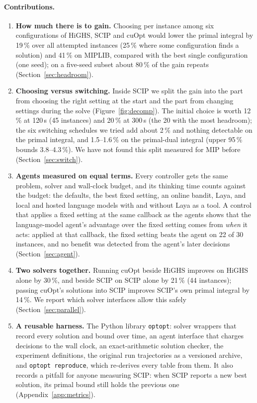 \documentclass[11pt]{article}
\begin{document}
\paragraph{Contributions.}
\begin{enumerate}
\item \textbf{How much there is to gain.} Choosing per instance among six configurations of HiGHS, SCIP and cuOpt
  would lower the primal integral by 19\,\% over all attempted instances (25\,\% where some configuration finds a
  solution) and 41\,\% on MIPLIB, compared with the best single configuration (one seed); on a five-seed subset about
  80\,\% of the gain repeats (Section~\ref{sec:headroom}).
\item \textbf{Choosing versus switching.} Inside SCIP we split the gain into the part from choosing the right
  setting at the start and the part from changing settings during the solve (Figure~\ref{fig:decomp}). The initial
  choice is worth 12\,\% at 120\,s (45 instances) and 20\,\% at 300\,s (the 20 with the most headroom); the six
  switching schedules we tried add about 2\,\% and nothing detectable on the primal integral, and 1.5--1.6\,\% on
  the primal-dual integral (upper 95\,\% bounds 3.8--4.3\,\%). We have not found this split measured for MIP before (Section~\ref{sec:switch}).
\item \textbf{Agents measured on equal terms.} Every controller gets the same problem, solver and wall-clock budget,
  and its thinking time counts against the budget: the defaults, the best fixed setting, an online bandit, Laya, and
  local and hosted language models with and without Laya as a tool. A control that applies a fixed setting at the
  same callback as the agents shows that the language-model agent's advantage over the fixed setting comes from
  \emph{when} it acts: applied at that callback, the fixed setting beats the agent on 22 of 30 instances, and no
  benefit was detected from the agent's later decisions (Section~\ref{sec:agent}).
\item \textbf{Two solvers together.} Running cuOpt beside HiGHS improves on HiGHS alone by 30\,\%, and beside SCIP on
  SCIP alone by 21\,\% (44 instances); passing cuOpt's
  solutions into SCIP improves SCIP's own primal integral by 14\,\%. We report which solver interfaces allow this
  safely (Section~\ref{sec:parallel}).
\item \textbf{A reusable harness.} The Python library \texttt{optopt}: solver wrappers that record every solution
  and bound over time, an agent interface that charges decisions to the wall clock, an exact-arithmetic solution
  checker, the experiment definitions, the original run trajectories as a versioned archive, and
  \texttt{optopt reproduce}, which re-derives every table from them. It
  also records a pitfall for anyone measuring SCIP: when SCIP reports a new best solution, its primal bound still
  holds the previous one (Appendix~\ref{app:metrics}).
\end{enumerate}
\end{document}
